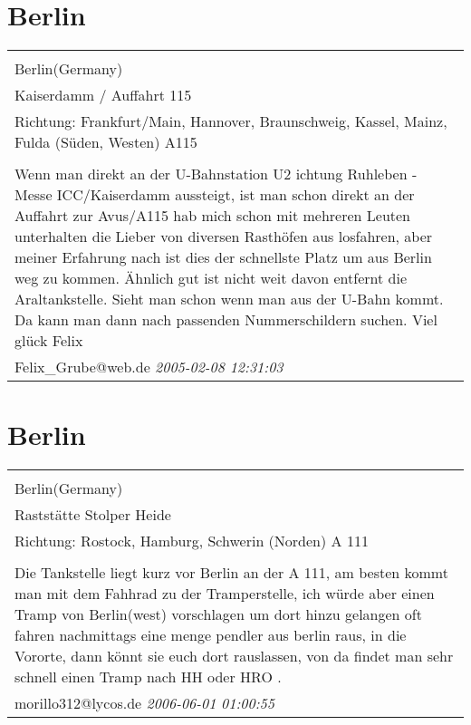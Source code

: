 \documentclass[a4paper,12pt]{article}
\begin{document}
\section{Berlin}
\begin{tabular}{|p{13cm}|}
\hline\\
Berlin(Germany)\\
Kaiserdamm / Auffahrt 115\\
Richtung: Frankfurt/Main, Hannover, Braunschweig, Kassel, Mainz, Fulda (Süden, Westen) A115 \\
\hline\\
Wenn man direkt an der U-Bahnstation U2 ichtung Ruhleben - Messe ICC/Kaiserdamm aussteigt, ist man schon direkt an der Auffahrt zur Avus/A115 hab mich schon mit mehreren Leuten unterhalten die Lieber von diversen Rasthöfen aus losfahren, aber meiner Erfahrung nach ist dies der schnellste Platz um aus Berlin weg zu kommen. Ähnlich gut ist nicht weit davon entfernt die Araltankstelle. Sieht man schon wenn man aus der U-Bahn kommt. Da kann man dann nach passenden Nummerschildern suchen.
Viel glück
Felix \\
Felix\_Grube@web.de \textit{ 2005-02-08 12:31:03 }\\\hline
\end{tabular}


\section{Berlin}
\begin{tabular}{|p{13cm}|}
\hline\\
Berlin(Germany)\\
Raststätte Stolper Heide\\
Richtung: Rostock, Hamburg, Schwerin (Norden) A 111 \\
\hline\\
Die Tankstelle liegt kurz vor Berlin an der A 111, am besten kommt man mit dem Fahhrad zu der Tramperstelle, ich würde aber einen Tramp von Berlin(west) vorschlagen um dort hinzu gelangen oft fahren nachmittags eine menge pendler aus berlin raus, in die Vororte, dann könnt sie euch dort rauslassen, von da findet man sehr schnell einen Tramp nach HH oder HRO . \\
morillo312@lycos.de \textit{ 2006-06-01 01:00:55 }\\\hline
\end{tabular}
\end{document}
